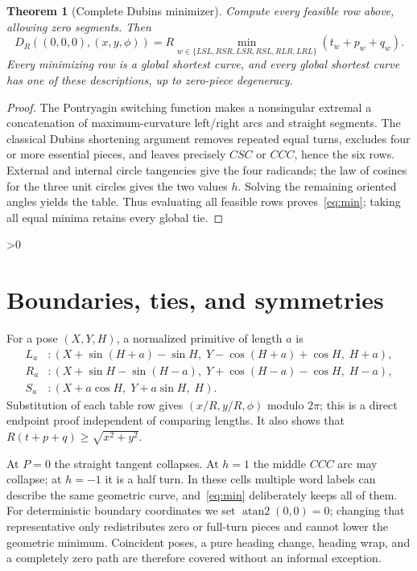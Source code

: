 \documentclass[10pt]{article}
\providecommand{\CRevisionRound}{2}
\newtheorem{theorem}{Theorem}
\begin{document}
\begin{theorem}[Complete Dubins minimizer]\label{thm:dubins}
Compute every feasible row above, allowing zero segments.  Then
\begin{equation}\label{eq:min}
 D_R((0,0,0),(x,y,\phi))
   =R\min_{w\in\{LSL,RSR,LSR,RSL,RLR,LRL\}}(t_w+p_w+q_w).
\end{equation}
Every minimizing row is a global shortest curve, and every global shortest
curve has one of these descriptions, up to zero-piece degeneracy.
\end{theorem}
\begin{proof}
The Pontryagin switching function makes a nonsingular extremal a concatenation
of maximum-curvature left/right arcs and straight segments.  The classical
Dubins shortening argument removes repeated equal turns, excludes four or
more essential pieces, and leaves precisely $CSC$ or $CCC$, hence the six
rows.  External and internal circle tangencies give the four radicands;
the law of cosines for the three unit circles gives the two values $h$.
Solving the remaining oriented angles yields the table.  Thus evaluating all
feasible rows proves~\eqref{eq:min}; taking all equal minima retains every
global tie.
\end{proof}

\ifnum\CRevisionRound>0
\section{Boundaries, ties, and symmetries}
For a pose $(X,Y,H)$, a normalized primitive of length $a$ is
\begin{align*}
 L_a &: (X+\sin(H+a)-\sin H,\;Y-\cos(H+a)+\cos H,\;H+a),\\
 R_a &: (X+\sin H-\sin(H-a),\;Y+\cos(H-a)-\cos H,\;H-a),\\
 S_a &: (X+a\cos H,\;Y+a\sin H,\;H).
\end{align*}
Substitution of each table row gives $(x/R,y/R,\phi)$ modulo $2\pi$; this is
a direct endpoint proof independent of comparing lengths.  It also shows
that $R(t+p+q)\ge\sqrt{x^2+y^2}$.

At $P=0$ the straight tangent collapses.  At $h=1$ the middle $CCC$ arc may
collapse; at $h=-1$ it is a half turn.  In these cells multiple word labels
can describe the same geometric curve, and~\eqref{eq:min} deliberately keeps
all of them.  For deterministic boundary coordinates we set
$\operatorname{atan2}(0,0)=0$; changing that representative only redistributes
zero or full-turn pieces and cannot lower the geometric minimum.  Coincident
poses, a pure heading change, heading wrap, and a completely zero path are
therefore covered without an informal exception.
\end{document}
